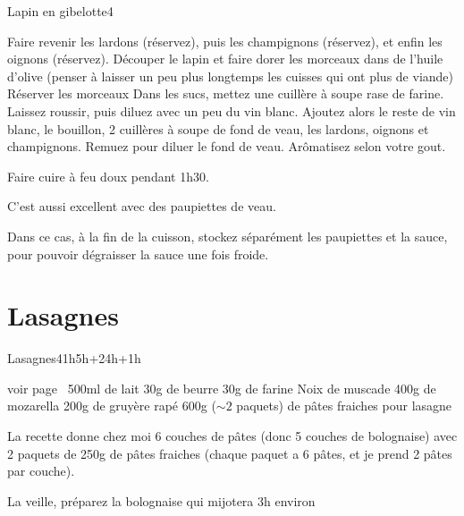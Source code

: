{\begin{recette}{Lapin en gibelotte}{4}{}{}
\begin{preparation}
\etape Faire revenir les lardons (réservez), puis les champignons (réservez), et enfin les oignons (réservez).
\etape Découper le lapin et faire dorer les morceaux dans de l'huile d'olive (penser à laisser un peu plus longtemps les cuisses 
qui ont plus de viande)
\etape Réserver les morceaux
\etape Dans les sucs, mettez une cuillère à soupe rase de farine. Laissez roussir, puis diluez avec un peu du vin blanc.
\etape Ajoutez alors le reste de vin blanc, le bouillon, 2 cuillères à soupe de fond de veau, les lardons, oignons et 
champignons. Remuez pour diluer le fond de veau.
\etape Arômatisez selon votre gout.
\end{preparation}

\begin{cuisson}
Faire cuire à feu doux pendant 1h30.

\begin{remarque}
C'est aussi excellent avec des paupiettes de veau.

Dans ce cas, à la fin de la cuisson, stockez séparément les paupiettes et la sauce, pour pouvoir dégraisser la sauce une fois 
froide.
\end{remarque}
\end{cuisson}
\end{recette}

\section{Lasagnes}
\begin{recette}{Lasagnes}{4}{1h}{5h+24h+1h}
\begin{ingredients}
\ingredient[bolognaise]
\ingredient voir page~\pageref{sec:bolognaise}
\ingredient[Béchamel]
\ingredient 500ml de lait
\ingredient 30g de beurre
\ingredient 30g de farine 
\ingredient Noix de muscade
\ingredient[lasagnes]
\ingredient 400g de mozarella
\ingredient 200g de gruyère rapé
\ingredient 600g ($\sim 2$ paquets) de pâtes fraiches pour lasagne
\end{ingredients}

\begin{remarque}
La recette donne chez moi 6 couches de pâtes (donc 5 couches de bolognaise) avec 2 paquets de 250g de pâtes fraiches (chaque paquet a 6 pâtes, et je prend 2 pâtes par couche). 
\end{remarque}

\begin{preparation}
\etape La veille, préparez la bolognaise qui mijotera 3h environ


\end{preparation}
\end{recette}}
